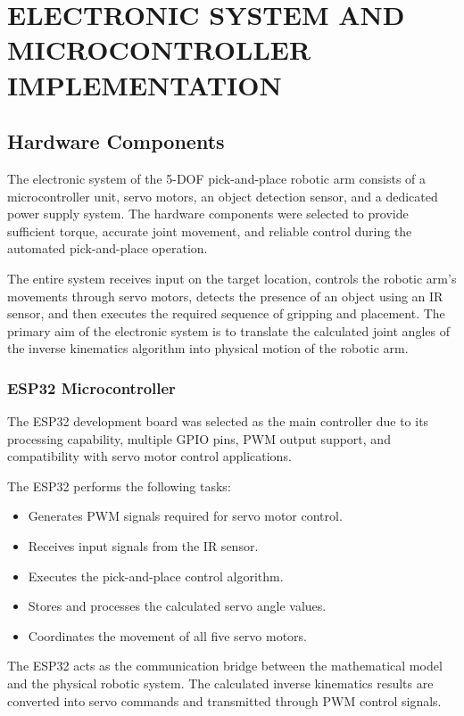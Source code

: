 \section{ELECTRONIC SYSTEM AND MICROCONTROLLER IMPLEMENTATION}

\subsection{Hardware Components}

The electronic system of the 5-DOF pick-and-place robotic arm consists of a microcontroller unit, servo motors, an object detection sensor, and a dedicated power supply system. The hardware components were selected to provide sufficient torque, accurate joint movement, and reliable control during the automated pick-and-place operation.

The entire system receives input on the target location, controls the robotic arm's movements through servo motors, detects the presence of an object using an IR sensor, and then executes the required sequence of gripping and placement. The primary aim of the electronic system is to translate the calculated joint angles of the inverse kinematics algorithm into physical motion of the robotic arm.

\subsubsection{ESP32 Microcontroller}

The ESP32 development board was selected as the main controller due to its processing capability, multiple GPIO pins, PWM output support, and compatibility with servo motor control applications.

The ESP32 performs the following tasks:

\begin{itemize}
    \item Generates PWM signals required for servo motor control.
    \item Receives input signals from the IR sensor.
    \item Executes the pick-and-place control algorithm.
    \item Stores and processes the calculated servo angle values.
    \item Coordinates the movement of all five servo motors.
\end{itemize}

The ESP32 acts as the communication bridge between the mathematical model and the physical robotic system. The calculated inverse kinematics results are converted into servo commands and transmitted through PWM control signals.

